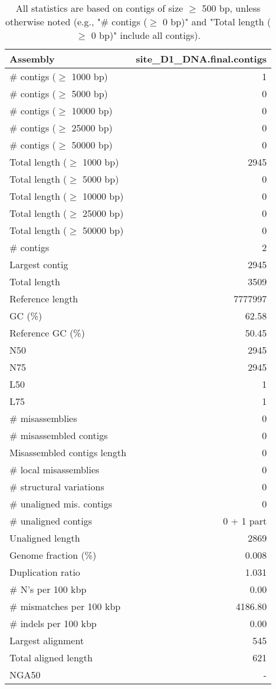 \documentclass[12pt,a4paper]{article}
\begin{document}
\begin{table}[ht]
\begin{center}
\caption{All statistics are based on contigs of size $\geq$ 500 bp, unless otherwise noted (e.g., "\# contigs ($\geq$ 0 bp)" and "Total length ($\geq$ 0 bp)" include all contigs).}
\begin{tabular}{|l*{1}{|r}|}
\hline
Assembly & site\_D1\_DNA.final.contigs \\ \hline
\# contigs ($\geq$ 1000 bp) & 1 \\ \hline
\# contigs ($\geq$ 5000 bp) & 0 \\ \hline
\# contigs ($\geq$ 10000 bp) & 0 \\ \hline
\# contigs ($\geq$ 25000 bp) & 0 \\ \hline
\# contigs ($\geq$ 50000 bp) & 0 \\ \hline
Total length ($\geq$ 1000 bp) & 2945 \\ \hline
Total length ($\geq$ 5000 bp) & 0 \\ \hline
Total length ($\geq$ 10000 bp) & 0 \\ \hline
Total length ($\geq$ 25000 bp) & 0 \\ \hline
Total length ($\geq$ 50000 bp) & 0 \\ \hline
\# contigs & 2 \\ \hline
Largest contig & 2945 \\ \hline
Total length & 3509 \\ \hline
Reference length & 7777997 \\ \hline
GC (\%) & 62.58 \\ \hline
Reference GC (\%) & 50.45 \\ \hline
N50 & 2945 \\ \hline
N75 & 2945 \\ \hline
L50 & 1 \\ \hline
L75 & 1 \\ \hline
\# misassemblies & 0 \\ \hline
\# misassembled contigs & 0 \\ \hline
Misassembled contigs length & 0 \\ \hline
\# local misassemblies & 0 \\ \hline
\# structural variations & 0 \\ \hline
\# unaligned mis. contigs & 0 \\ \hline
\# unaligned contigs & 0 + 1 part \\ \hline
Unaligned length & 2869 \\ \hline
Genome fraction (\%) & 0.008 \\ \hline
Duplication ratio & 1.031 \\ \hline
\# N's per 100 kbp & 0.00 \\ \hline
\# mismatches per 100 kbp & 4186.80 \\ \hline
\# indels per 100 kbp & 0.00 \\ \hline
Largest alignment & 545 \\ \hline
Total aligned length & 621 \\ \hline
NGA50 & - \\ \hline
\end{tabular}
\end{center}
\end{table}
\end{document}
